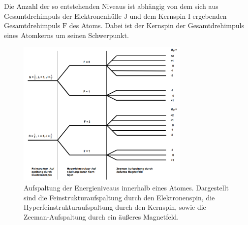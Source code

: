 \documentclass[
  bibliography=totoc,     %
  captions=tableheading,  %
  titlepage=firstiscover, %
]{scrartcl}
\begin{document}
%
Die Anzahl der so
entstehenden Niveaus ist abhängig von dem sich aus Gesamtdrehimpuls der
Elektronenhülle $\mathup{J}$ und dem Kernspin $\mathup{I}$ ergebenden
Gesamtdrehimpuls $\mathup{F}$ des Atoms. Dabei ist der Kernspin der
Gesamtdrehimpuls eines Atomkerns um seinen Schwerpunkt.
%
\begin{figure}[h]
  \centering
  \includegraphics[width=0.75\textwidth]{Aufspaltung.jpg}
  \caption{Aufspaltung der Energieniveaus innerhalb eines Atomes. Dargestellt
  sind die Feinstrukturaufspaltung durch den Elektronenspin, die
  Hyperfeinstrukturaufspaltung durch den Kernspin, sowie die Zeeman-Aufspaltung
  durch ein äußeres Magnetfeld. \cite{anleitung}}
  \label{fig:aufspaltung}
\end{figure}
\end{document}

